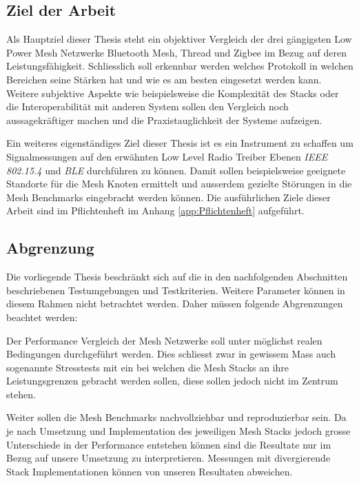 \subsection{Ziel der Arbeit}\label{subsec:ZielderArbeit}

Als Hauptziel dieser Thesis steht ein objektiver Vergleich der drei gängigsten Low Power Mesh Netzwerke Bluetooth Mesh, Thread und Zigbee im Bezug auf deren Leistungsfähigkeit.
Schliesslich soll erkennbar werden welches Protokoll in welchen Bereichen seine Stärken hat und wie es am besten eingesetzt werden kann.
Weitere subjektive Aspekte wie beispielsweise die Komplexität des Stacks oder die Interoperabilität mit anderen System sollen den Vergleich noch aussagekräftiger machen und die Praxistauglichkeit der Systeme aufzeigen.

Ein weiteres eigenständiges Ziel dieser Thesis ist es ein Instrument zu schaffen um Signalmessungen auf den erwähnten Low Level Radio Treiber Ebenen \textit{IEEE 802.15.4} und \textit{BLE} durchführen zu können. Damit sollen beispielsweise geeignete Standorte für die Mesh Knoten ermittelt und ausserdem gezielte Störungen in die Mesh Benchmarks eingebracht werden können.
Die ausführlichen Ziele dieser Arbeit sind im Pflichtenheft im Anhang \ref{app:Pflichtenheft} aufgeführt.


\subsection{Abgrenzung}\label{sec:Abgrenzung}
Die vorliegende Thesis beschränkt sich auf die in den nachfolgenden Abschnitten beschriebenen Testumgebungen und Testkriterien. Weitere Parameter können in diesem Rahmen nicht betrachtet werden.
Daher müssen folgende Abgrenzungen beachtet werden:

Der Performance Vergleich der Mesh Netzwerke soll unter möglichst realen Bedingungen durchgeführt werden. Dies schliesst zwar in gewissem Mass auch sogenannte Stresstests mit ein bei welchen die Mesh Stacks an ihre Leistungsgrenzen gebracht werden sollen, diese sollen jedoch nicht im Zentrum stehen.

Weiter sollen die Mesh Benchmarks nachvollziehbar und reproduzierbar sein. Da je nach Umsetzung und Implementation des jeweiligen Mesh Stacks jedoch grosse Unterschiede in der Performance entstehen können sind die Resultate nur im Bezug auf unsere Umsetzung zu interpretieren. Messungen mit divergierende Stack Implementationen können von unseren Resultaten abweichen.

